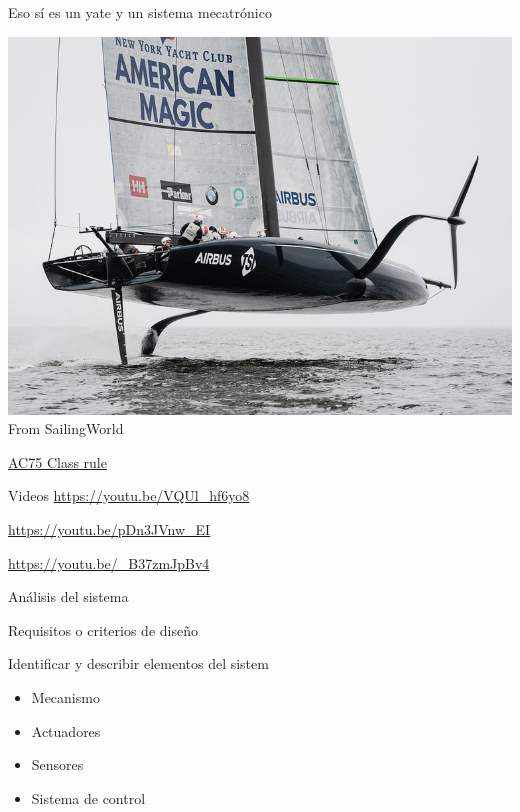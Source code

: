 \documentclass[presentation,aspectratio=169]{beamer}
\begin{document}
\begin{frame}[label={sec:org16f6c9b}]{Eso \alert{sí} es un yate \alert{y} un sistema mecatrónico}
\begin{center}
\includegraphics[height=0.7\textheight]{../../figures/ac75.jpeg}\\
{\footnotesize  From SailingWorld}
\end{center}

\href{https://www.sailingscuttlebutt.com/wp-content/uploads/2018/03/AC75\_Class\_Rule.pdf}{AC75 Class rule}
\end{frame}

\begin{frame}[label={sec:org9c5253c}]{Videos}
\url{https://youtu.be/VQUl\_hf6yo8}

\url{https://youtu.be/pDn3JVnw\_EI}

\url{https://youtu.be/\_B37zmJpBv4}
\end{frame}

\begin{frame}[label={sec:org541757c}]{Análisis del sistema}
\begin{block}{Requisitos o criterios de diseño}
\end{block}

\begin{block}{Identificar y describir elementos del sistem}
\begin{itemize}
\item Mecanismo
\item Actuadores
\item Sensores
\item Sistema de control
\end{itemize}
\end{block}
\end{frame}
\end{document}

